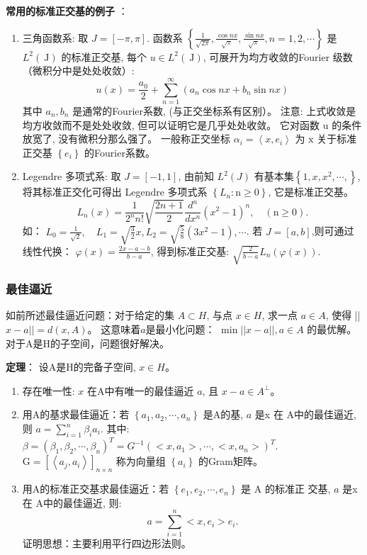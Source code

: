 \documentclass[12pt,a4paper]{article}
\begin{document}
\textbf{常用的标准正交基的例子
}：
\begin{enumerate}
	\item 三角函数系: 取 $J=[-\pi, \pi]$. 函数系 $\left\{\frac{1}{\sqrt{2 \pi}}, \frac{\cos n x}{\sqrt{\pi}}, \frac{\sin n x}{\sqrt{\pi}}, n=1,2, \cdots\right\}$
是 $L^{2}(\mathrm{~J})$ 的标准正交基, 每个 $u \in L^{2}(\mathrm{~J})$, 可展开为均方收敛的Fourier 级数（微积分中是处处收敛）:
$$u(x)=\frac{a_{0}}{2}+\sum_{n=1}^{\infty}\left(a_{n} \cos n x+b_{n} \sin n x\right)$$
其中 $a_{n}, b_{n}$ 是通常的Fourier系数, (与正交坐标系有区别）。
注意: 上式收敛是均方收敛而不是处处收敛, 但可以证明它是几乎处处收敛。 它对函数 $\mathrm{u}$ 的条件放宽了, 没有微积分那么强了。
一般称正交坐标 $\alpha_{i}=\left\langle x, e_{i}\right\rangle$ 为 $\mathrm{x}$ 关于标准正交基 $\left\{e_{i}\right\}$ 的Fourier系数。
		\item  Legendre 多项式系: 取 $J=[-1,1]$,
由前知 $L^{2}(J)$ 有基本集$\left\{1, x, x^{2}, \cdots,\right\}$,  将其标准正交化可得出 Legendre 多项式系 $\left\{L_{n}: \mathrm{n} \geq 0\right\}$, 它是标准正交基。
$$
L_{n}(x)=\frac{1}{2^{n} n !} \sqrt{\frac{2 n+1}{2}} \frac{d^{n}}{d x^{n}}\left(x^{2}-1\right)^{n}, \quad(\mathrm{n} \geq 0) .
$$
如： $L_{0}=\frac{1}{\sqrt{2}},\quad L_{1}=\sqrt{\frac{3}{2}} x, L_{2}=\sqrt{\frac{5}{8}}\left(3 x^{2}-1\right), \cdots$.
若 $J=[a, b]$,则可通过线性代换： $\varphi(x)=\frac{2 x-a-b}{b-a}$, 得到标准正交基: $\sqrt{\frac{2}{b-a}} L_{n}(\varphi(x))$.
\end{enumerate}

\subsubsection{最佳逼近}
如前所述最佳逼近问题：对于给定的集 $A \subset H$, 与点 $x \in H$, 求一点 $a \in A$, 使得 ||$x-a||=d(x, A)$。 这意味着$a$是最小化问题： $\min || x-a||, a \in A$
的最优解。对于A是H的子空间，问题很好解决。

\textbf{定理}： 设A是H的完备子空间, $x \in H$。
\begin{enumerate}
	\item 存在唯一性: $x$ 在A中有唯一的最佳逼近 $a$, 且 $x-a \in A^{\perp}$。
	\item 用A的基求最佳逼近：若 $\left\{a_{1}, a_{2}, \cdots, a_{n}\right\}$ 是A的基, $a$ 是x 在 A中的最佳逼近, 则 $a=\sum_{i=1}^{n} \beta_{i} a_{i}$. 其中:
$\beta=\left(\beta_{1}, \beta_{2}, \cdots, \beta_{n}\right)^{T}=G^{-1}\left(<x, a_{1}>, \cdots,<x, a_{n}>\right)^{T} .$
$\mathrm{G}=\left[\left\langle a_{j}, a_{i}\right\rangle\right]_{n \times n}$ 称为向量组 $\left\{a_{i}\right\}$ 的Gram矩阵。
	\item 用A的标准正交基求最佳逼近：若 $\left\{e_{1}, e_{2}, \cdots, e_{n}\right\}$ 是 $\mathrm{A}$ 的标准正
交基, $a$ 是x 在 A中的最佳逼近, 则:
$$
a=\sum_{i=1}^{n}<x, e_{i}>e_{i} .
$$
证明思想：主要利用平行四边形法则。
\end{enumerate}
\end{document}
